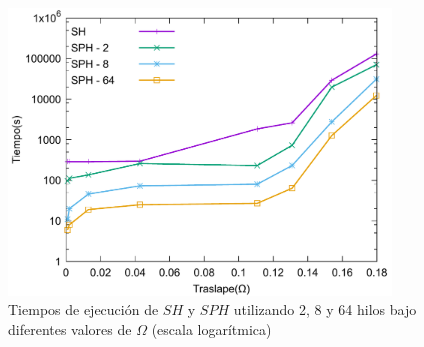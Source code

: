 \begin{figure}[hbtp]
\centering
\includegraphics[width=4in]{graphs/traslape_hrg}
\caption{Tiempos de ejecución de $SH$ y $SPH$ utilizando 2, 8 y 64 hilos bajo diferentes valores de $\Omega$ (escala logarítmica)}
\label{fig:traslape-h}
\end{figure}

%
%
%
%

